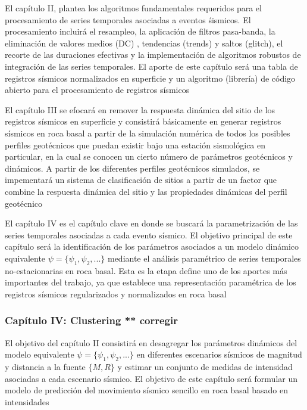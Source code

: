 \documentclass[
]{krantz}
\begin{document}
El capítulo II, plantea los algoritmos fundamentales requeridos para el procesamiento de series temporales asociadas a eventos śismicos. El procesamiento incluirá el resampleo, la aplicación de filtros pasa-banda, la eliminación de valores medios (DC) , tendencias (trends) y saltos (glitch), el recorte de las duraciones efectivas y la implementación de algoritmos robustos de integración de las series temporales. El aporte de este capítulo será una tabla de registros sísmicos normalizados en superficie y un algoritmo (librería) de código abierto para el procesamiento de registros sísmicos

El capítulo III se efocará en remover la respuesta dinámica del sitio de los registros sísmicos en superficie y consistirá básicamente en generar registros sísmicos en roca basal a partir de la simulación numérica de todos los posibles perfiles geotécnicos que puedan existir bajo una estación sismológica en particular, en la cual se conocen un cierto número de parámetros geotécnicos y dinámicos. A partir de los diferentes perfiles geotécnicos simulados, se impementará un sistema de clasificación de sitios a partir de un factor que combine la respuesta dinámica del sitio y las propiedades dinámicas del perfil geotécnico

El capítulo IV es el capítulo clave en donde se buscará la parametrización de las series temporales asociadas a cada evento sísmico. El objetivo principal de este capítulo será la identificación de los parámetros asociados a un modelo dinámico equivalente \(\psi = \{ \psi_1,\psi_2,... \}\) mediante el análisis paramétrico de series temporales no-estacionarias en roca basal. Esta es la etapa define uno de los aportes más importantes del trabajo, ya que establece una representación paramétrica de los registros sísmicos regularizados y normalizados en roca basal

\hypertarget{capuxedtulo-iv-clustering-corregir}{%
\subsubsection*{Capítulo IV: Clustering ** corregir}\label{capuxedtulo-iv-clustering-corregir}}

El objetivo del capítulo II consistirá en desagregar los parámetros dinámicos del modelo equivalente \(\psi = \{ \psi_1,\psi_2,... \}\) en diferentes escenarios sísmicos de magnitud y distancia a la fuente \(\{M,R\}\) y estimar un conjunto de medidas de intensidad asociadas a cada escenario sísmico. El objetivo de este capítulo será formular un modelo de predicción del movimiento sísmico sencillo en roca basal basado en intensidades
\end{document}
